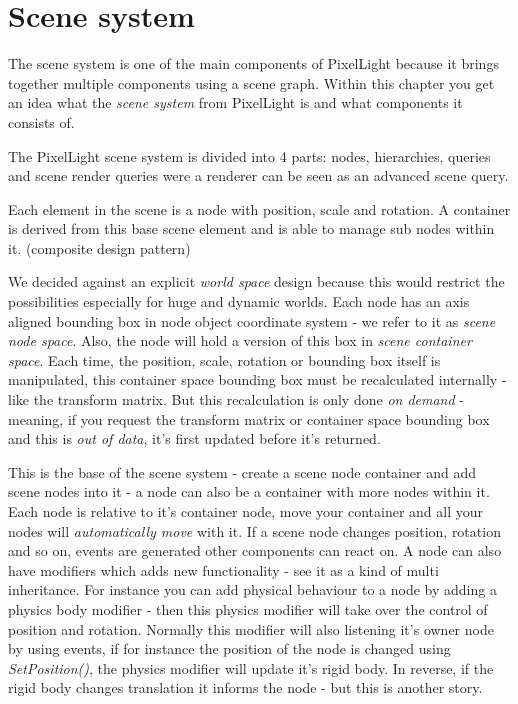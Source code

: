 \section{Scene system}
The scene system is one of the main components of PixelLight because it brings together multiple components using a scene graph. Within this chapter you get an idea what the \emph{scene system} from PixelLight is and what components it consists of.

The PixelLight scene system is divided into 4 parts: nodes, hierarchies, queries and scene render queries were a renderer can be seen as an advanced scene query.

Each element in the scene is a node with position, scale and rotation. A container is derived from this base scene element and is able to manage sub nodes within it. (composite design pattern)

We decided against an explicit \emph{world space} design because this would restrict the possibilities especially for huge and dynamic worlds. Each node has an axis aligned bounding box in node object coordinate system - we refer to it as \emph{scene node space}. Also, the node will hold a version of this box in \emph{scene container space}. Each time, the position, scale, rotation or bounding box itself is manipulated, this container space bounding box must be recalculated internally - like the transform matrix. But this recalculation is only done \emph{on demand} - meaning, if you request the transform matrix or container space bounding box and this is \emph{out of data}, it's first updated before it's returned.

This is the base of the scene system - create a scene node container and add scene nodes into it - a node can also be a container with more nodes within it. Each node is relative to it's container node, move your container and all your nodes will \emph{automatically move} with it. If a scene node changes position, rotation and so on, events are generated other components can react on. A node can also have modifiers which adds new functionality - see it as a kind of multi inheritance. For instance you can add physical behaviour to a node by adding a physics body modifier - then this physics modifier will take over the control of position and rotation. Normally this modifier will also listening it's owner node by using events, if for instance the position of the node is changed using \emph{SetPosition()}, the physics modifier will update it's rigid body. In reverse, if the rigid body changes translation it informs the node - but this is another story.


